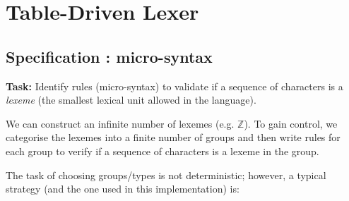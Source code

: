\flushleft
\chapter{Table-Driven Lexer}
\section{Specification : micro-syntax}

\textbf{Task:} Identify rules (micro-syntax) to validate if a sequence of characters is a \emph{lexeme} (the smallest lexical unit allowed in the language).

\vskip 0.2in

We can construct an infinite number of lexemes (e.g. $\mathbb{Z}$). To gain control, we categorise the lexemes into a finite number of groups and then write rules for each group to verify if a sequence of characters is a lexeme in the group.
\vskip 0.2in

The task of choosing groups/types is not deterministic; however, a typical strategy (and the one used in this implementation) is:

